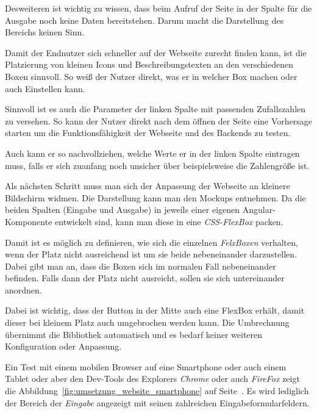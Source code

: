 Desweiteren ist wichtig zu wissen, dass beim Aufruf der Seite in der Spalte für die Ausgabe noch keine Daten
bereitstehen. Darum macht die Darstellung des Bereichs keinen Sinn.

Damit der Endnutzer sich schneller auf der Webseite zurecht finden kann, ist die Platzierung von kleinen Icons und
Beschreibungstexten an den verschiedenen Boxen sinnvoll. So weiß der Nutzer direkt, was er in welcher Box machen oder
auch Einstellen kann.

Sinnvoll ist es auch die Parameter der linken Spalte mit passenden Zufallszahlen zu versehen. So kann der Nutzer direkt
nach dem öffnen der Seite eine Vorhersage starten um die Funktionsfähigkeit der Webseite und des Backends zu testen.

Auch kann er so nachvollziehen, welche Werte er in der linken Spalte eintragen muss, falls er sich zuanfang noch
unsicher über beispielsweise die Zahlengröße ist.

Als nächsten Schritt muss man sich der Anpassung der Webseite an kleinere Bildschirm widmen. Die Darstellung kann man
den Mockups entnehmen. Da die beiden Spalten (Eingabe und Ausgabe) in jeweils einer eigenen Angular-Komponente
entwickelt sind, kann man diese in eine \textit{CSS-FlexBox} packen.

Damit ist es möglich zu definieren, wie sich die einzelnen \textit{FelxBoxen} verhalten, wenn der Platz nicht
ausreichend ist um sie beide nebeneinander darzustellen. Dabei gibt man an, dass die Boxen sich im normalen Fall
nebeneinander befinden. Falls dann der Platz nicht ausreicht, sollen sie sich untereinander anordnen.

Dabei ist wichtig, dass der Button in der Mitte auch eine FlexBox erhält, damit dieser bei kleinem Platz auch
umgebrochen werden kann. Die Umbrechnung übernimmt die Bibliothek automatisch und es bedarf keiner weiteren
Konfiguration oder Anpassung.

Ein Test mit einem mobilen Browser auf eine Smartphone oder auch einem Tablet oder aber den Dev-Tools des Explorers
\textit{Chrome} oder auch \textit{FireFox} zeigt die Abbildung~\ref{fig:umsetzung_website_smartphone} auf
Seite~\pageref{fig:umsetzung_website_smartphone}. Es wird lediglich der Bereich der \textit{Eingabe} angezeigt mit
seinen zahlreichen Eingabeformularfeldern.

